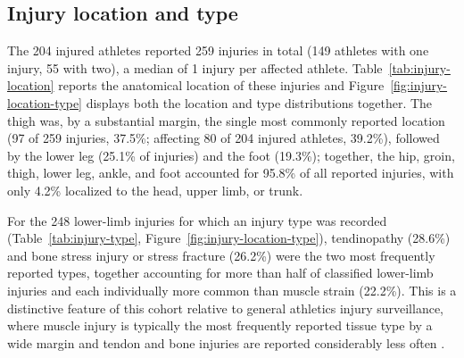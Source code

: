 \subsection{Injury location and type}
\label{sec:results-pattern}
The 204 injured athletes reported 259 injuries in total (149 athletes with one injury, 55 with two), a median of 1 injury per affected athlete. Table~\ref{tab:injury-location} reports the anatomical location of these injuries and Figure~\ref{fig:injury-location-type} displays both the location and type distributions together. The thigh was, by a substantial margin, the single most commonly reported location (97 of 259 injuries, 37.5\%; affecting 80 of 204 injured athletes, 39.2\%), followed by the lower leg (25.1\% of injuries) and the foot (19.3\%); together, the hip, groin, thigh, lower leg, ankle, and foot accounted for 95.8\% of all reported injuries, with only 4.2\% localized to the head, upper limb, or trunk.

For the 248 lower-limb injuries for which an injury type was recorded (Table~\ref{tab:injury-type}, Figure~\ref{fig:injury-location-type}), tendinopathy (28.6\%) and bone stress injury or stress fracture (26.2\%) were the two most frequently reported types, together accounting for more than half of classified lower-limb injuries and each individually more common than muscle strain (22.2\%). This is a distinctive feature of this cohort relative to general athletics injury surveillance, where muscle injury is typically the most frequently reported tissue type by a wide margin and tendon and bone injuries are reported considerably less often \citep{edouard2020injury}.

